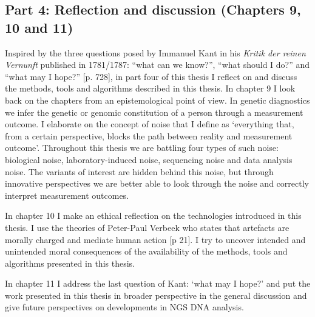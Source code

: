 \subsection[Reflection and discussion]{Part 4: Reflection and discussion \newline (Chapters 9, 10 and 11)}\label{Part4}
Inspired by the three questions posed by Immanuel Kant in his \textsl{Kritik der reinen Vernunft} published in 1781/1787: “what can we know?”, “what should I do?” and “what may I hope?” \cite{Kant_1781a}[p. 728], in part four of this thesis I reflect on and discuss the methods, tools and algorithms described in this thesis. 
In chapter 9 I look back on the chapters from an epistemological point of view. 
In genetic diagnostics we infer the genetic or genomic constitution of a person through a measurement outcome. 
I elaborate on the concept of noise that I define as ‘everything that, from a certain perspective, blocks the path between reality and measurement outcome’. 
Throughout this thesis we are battling four types of such noise: biological noise, laboratory-induced noise, sequencing noise and data analysis noise. 
The variants of interest are hidden behind this noise, but through innovative perspectives we are better able to look through the noise and correctly interpret measurement outcomes. 

In chapter 10 I make an ethical reflection on the technologies introduced in this thesis. I use the theories of Peter-Paul Verbeek who states that artefacts are morally charged and mediate human action \cite{Verbeek_2011}[p 21]. 
I try to uncover intended and unintended moral consequences of the availability of the methods, tools and algorithms presented in this thesis. 

In chapter 11 I address the last question of Kant: ‘what may I hope?’ and put the work presented in this thesis in broader perspective in the general discussion and give future perspectives on developments in NGS DNA analysis.

